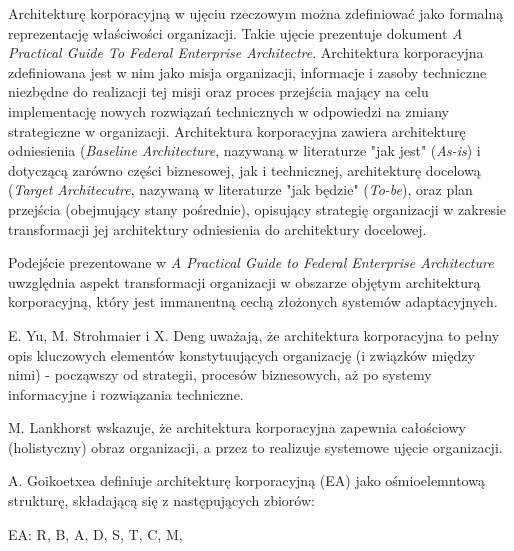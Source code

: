 Architekturę korporacyjną w ujęciu rzeczowym można zdefiniować jako formalną reprezentację właściwości organizacji. Takie ujęcie prezentuje dokument \textit{A Practical Guide To Federal Enterprise Architectre}. Architektura korporacyjna zdefiniowana jest w nim jako misja organizacji, informacje i zasoby techniczne niezbędne do realizacji tej misji oraz proces przejścia mający na celu implementację nowych rozwiązań technicznych w odpowiedzi na zmiany strategiczne w organizacji. Architektura korporacyjna zawiera architekturę odniesienia (\textit{Baseline Architecture}, nazywaną w literaturze "jak jest" (\textit{As-is}) i dotyczącą zarówno części biznesowej, jak i technicznej, architekturę docelową (\textit{Target Architecutre}, nazywaną w literaturze "jak będzie" (\textit{To-be}), oraz plan przejścia (obejmujący stany pośrednie), opisujący strategię organizacji w zakresie transformacji jej architektury odniesienia do architektury docelowej. 

Podejście prezentowane w \textit{A Practical Guide to Federal Enterprise Architecture} uwzględnia aspekt transformacji organizacji w obszarze objętym architekturą korporacyjną, który jest immanentną cechą złożonych systemów adaptacyjnych. 

E. Yu, M. Strohmaier i X. Deng uważają, że architektura korporacyjna to pełny opis kluczowych elementów konstytuujących organizację (i związków między nimi) - począwszy od strategii, procesów biznesowych, aż po systemy informacyjne i rozwiązania techniczne.

M. Lankhorst wskazuje, że architektura korporacyjna zapewnia całościowy (holistyczny) obraz organizacji, a przez to realizuje systemowe ujęcie organizacji. 

A. Goikoetxea definiuje architekturę korporacyjną (EA) jako ośmioelemntową strukturę, składającą się z następujących zbiorów:

\begin{center}
EA: {R, B, A, D, S, T, C, M},
\end{center}

